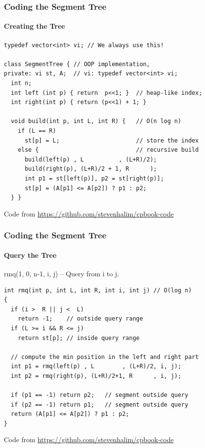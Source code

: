 \begin{frame}[fragile]
  \frametitle{Coding the Segment Tree}
  \framesubtitle{Creating the Tree}
{\smaller
\begin{block}{}
\begin{verbatim}
typedef vector<int> vi; // We always use this!

class SegmentTree { // OOP implementation,
private: vi st, A;  // vi: typedef vector<int> vi;
  int n;
  int left (int p) { return  p<<1; }  // heap-like index;
  int right(int p) { return (p<<1) + 1; }

  void build(int p, int L, int R) {   // O(n log n)
    if (L == R)
      st[p] = L;                      // store the index
    else {                            // recursive build
      build(left(p) , L          , (L+R)/2);
      build(right(p), (L+R)/2 + 1, R      );
      int p1 = st[left(p)], p2 = st[right(p)];
      st[p] = (A[p1] <= A[p2]) ? p1 : p2;
  } }
\end{verbatim}
\end{block}}

\hfill\footnotesize{Code from \url{https://github.com/stevenhalim/cpbook-code}}

\end{frame}

\begin{frame}[fragile]
  \frametitle{Coding the Segment Tree}
  \framesubtitle{Query the Tree}
{\smaller
\begin{block}{rmq(1, 0, n-1, i, j) -- Query from i to j.}
\begin{verbatim}
int rmq(int p, int L, int R, int i, int j) // O(log n)
{
  if (i >  R || j <  L)
    return -1;    // outside query range
  if (L >= i && R <= j)
    return st[p]; // inside query range

  // compute the min position in the left and right part
  int p1 = rmq(left(p) , L        , (L+R)/2, i, j);
  int p2 = rmq(right(p), (L+R)/2+1, R      , i, j);

  if (p1 == -1) return p2;   // segment outside query
  if (p2 == -1) return p1;   // segment outside query
  return (A[p1] <= A[p2]) ? p1 : p2;
}
\end{verbatim}
\end{block}}
\hfill\footnotesize{Code from \url{https://github.com/stevenhalim/cpbook-code}}
\end{frame}

